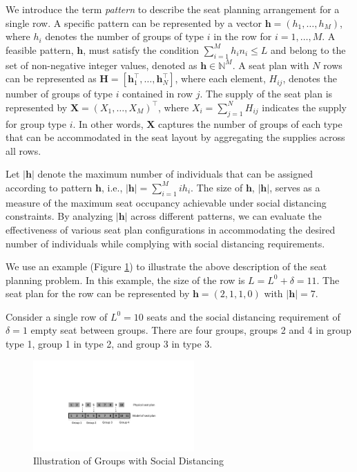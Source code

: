 We introduce the term \textit{pattern} to describe the seat planning arrangement for a single row. A specific pattern can be represented by a vector $\bm{h} = (h_1, \ldots, h_M)$, where $h_i$ denotes the number of groups of type $i$ in the row for $i = 1,\ldots, M$. A feasible pattern, $\bm{h}$, must satisfy the condition $\sum_{i=1}^{M} h_i n_i \leq L$ and belong to the set of non-negative integer values, denoted as $\bm{h} \in \mathbb{N}^{M}$. A seat plan with $N$ rows can be represented as $\bm{H} = [\bm{h}_{1}^{\intercal}, \ldots, \bm{h}_{N}^{\intercal}]$, where each element, $H_{ij}$, denotes the number of groups of type $i$ contained in row $j$. The supply of the seat plan is represented by $\bm{X} = (X_{1}, \ldots, X_{M})^{\intercal}$, where $X_i= \sum_{j=1}^{N} H_{ij}$ indicates the supply for group type $i$. In other words, $\bm{X}$ captures the number of groups of each type that can be accommodated in the seat layout by aggregating the supplies across all rows.

Let $|\bm{h}|$ denote the maximum number of individuals that can be assigned according to pattern $\bm{h}$, i.e., $|\bm{h}| = \sum_{i =1}^{M} i h_i$. The size of $\bm{h}$, $|\bm{h}|$, serves as a measure of the maximum seat occupancy achievable under social distancing constraints. By analyzing $|\bm{h}|$ across different patterns, we can evaluate the effectiveness of various seat plan configurations in accommodating the desired number of individuals while complying with social distancing requirements.

We use an example (Figure \ref{fex1}) to illustrate the above description of the seat planning problem. In this example, the size of the row is $L = L^{0} + \delta =11$. The seat plan for the row can be represented by $\bm{h} = (2,1,1,0)$ with $|\bm{h}| = 7$.

\begin{example}
Consider a single row of $L^0=10$ seats and the social distancing requirement of $\delta = 1$ empty seat between groups. There are four groups, groups 2 and 4 in group type 1, group 1 in type 2, and group 3 in type 3.
\end{example}

\begin{figure}[ht]
    \centering
        \includegraphics[width=0.55\textwidth]{./Figures/model_plan.pdf}
    \caption{Illustration of Groups with Social Distancing}\label{fex1}
\end{figure}

